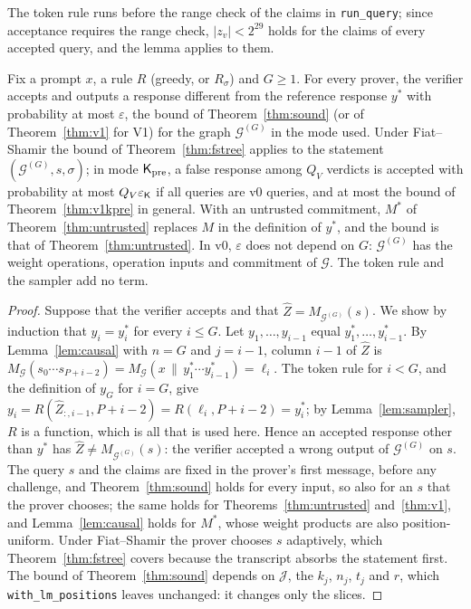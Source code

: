 \noindent The token rule runs before the range check of the claims in \texttt{run\_query}; since
acceptance requires the range check, $|z_v|<2^{29}$ holds for the claims of every accepted query,
and the lemma applies to them.

\begin{theorem}
\label{thm:gen}
Fix a prompt $x$, a rule $R$ (greedy, or $R_\sigma$) and $G\ge1$. For every prover, the verifier
accepts and outputs a response different from the reference response $y^\ast$ with probability at
most $\varepsilon$, the bound of Theorem~\ref{thm:sound} (or of Theorem~\ref{thm:v1} for V1) for the
graph $\mathcal G^{(G)}$ in the mode used. Under Fiat--Shamir the bound of Theorem~\ref{thm:fstree}
applies to the statement $(\mathcal G^{(G)},s,\sigma)$; in mode $\mathsf{K}_{\mathrm{pre}}$, a false response among
$Q_V$ verdicts is accepted with probability at most $Q_V\varepsilon_{\mathsf{K}}$ if all queries are v0
queries, and at most the bound of Theorem~\ref{thm:v1kpre} in general.
With an untrusted commitment, $M^\ast$ of Theorem~\ref{thm:untrusted}
replaces $M$ in the definition of $y^\ast$, and the bound is that of Theorem~\ref{thm:untrusted}.
In v0, $\varepsilon$ does not depend on $G$: $\mathcal G^{(G)}$ has the weight operations,
operation inputs and commitment of $\mathcal G$. The token rule and the sampler add no term.
\end{theorem}

\begin{proof}
Suppose that the verifier accepts and that $\hat Z=M_{\mathcal G^{(G)}}(s)$. We show by induction
that $y_i=y^\ast_i$ for every $i\le G$. Let $y_1,\dots,y_{i-1}$ equal $y^\ast_1,\dots,y^\ast_{i-1}$.
By Lemma~\ref{lem:causal} with $n=G$ and $j=i-1$, column $i-1$ of $\hat Z$ is
$M_{\mathcal G}(s_0\cdots s_{P+i-2})=M_{\mathcal G}(x\,\|\,y^\ast_1\cdots y^\ast_{i-1})=\ell_i$. The
token rule for $i<G$, and the definition of $y_G$ for $i=G$, give
$y_i=R(\hat Z_{:,i-1},P+i-2)=R(\ell_i,P+i-2)=y^\ast_i$; by Lemma~\ref{lem:sampler}, $R$ is a
function, which is all that is used here. Hence an accepted response other than $y^\ast$ has
$\hat Z\neq M_{\mathcal G^{(G)}}(s)$: the verifier accepted a wrong output of $\mathcal G^{(G)}$ on
$s$. The query $s$ and the claims are fixed in the prover's first message, before any challenge,
and Theorem~\ref{thm:sound} holds for every input, so also for an $s$ that the prover chooses; the
same holds for Theorems~\ref{thm:untrusted} and~\ref{thm:v1}, and Lemma~\ref{lem:causal} holds for
$M^\ast$, whose weight products are also position-uniform. Under Fiat--Shamir the prover chooses
$s$ adaptively, which Theorem~\ref{thm:fstree} covers because the transcript absorbs the statement
first. The bound of Theorem~\ref{thm:sound} depends on $\mathcal J$, the $k_j$, $n_j$, $t_j$ and
$r$, which \texttt{with\_lm\_positions} leaves unchanged: it changes only the slices.
\end{proof}

